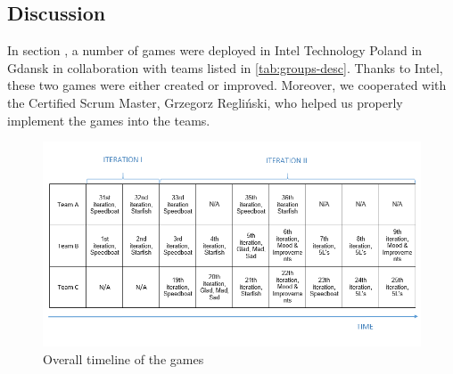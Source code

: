 \subsection{Discussion}

In section , a number of games were deployed in Intel Technology Poland in Gdansk in collaboration with teams listed in  \autoref{tab:groups-desc}. Thanks to Intel, these two games were either created or improved.  Moreover,  we  cooperated  with the Certified  Scrum  Master,  Grzegorz Regliński, who helped us properly implement the games into the teams.

\begin{figure}[!htbp]
\caption{Overall timeline of the games}
\label{fig:overallTimeline}
\centering
\includegraphics[width=1\textwidth]{img/overall}
\end{figure}

